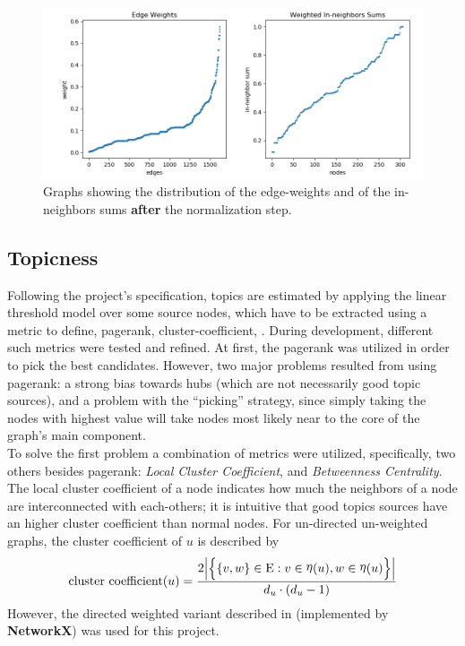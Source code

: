 \begin{figure}[h!]
     \centering
     \includegraphics[width=\textwidth]{img/afternorm.png}
  \caption{Graphs showing the distribution of the edge-weights and of the in-neighbors sums \textbf{after} the normalization step.}
  \label{fig:weight_afternorm}
 \end{figure}
  

 
\subsection{Topicness}\label{subsec:topicness}
Following the project's specification, topics are estimated by applying the linear threshold model over some source nodes, which have to be extracted using a metric to define, \ie{} pagerank, cluster-coefficient, \etc{}. During development, different such metrics were tested and refined. At first, the pagerank was utilized in order to pick the best candidates. However, two major problems resulted from using pagerank: a strong bias towards hubs (which are not necessarily good topic sources), and a problem with the \enquote{picking} strategy, since simply taking the nodes with highest value will take nodes most likely near to the core of the graph's main component.\\
To solve the first problem a combination of metrics were utilized, specifically, two others besides pagerank: \textit{Local Cluster Coefficient}, and \textit{Betweenness Centrality}. The local cluster coefficient of a node indicates how much the neighbors of a node are interconnected with each-others; it is intuitive that good topics sources have an higher cluster coefficient than normal nodes. For un-directed un-weighted graphs, the cluster coefficient of $u$ is described by
\[
\mathrm{cluster\ coefficient}(u) = \frac{2\Big|\Big\{\{v,w\}\in \Edges:v\in\Neighbours(u), w\in\Neighbours(u)\Big\}\Big|}{d_u\cdot(d_u - 1)}
\]
However, the directed weighted variant described in \cite{clustering} (implemented by \textbf{NetworkX}) was used for this project.

